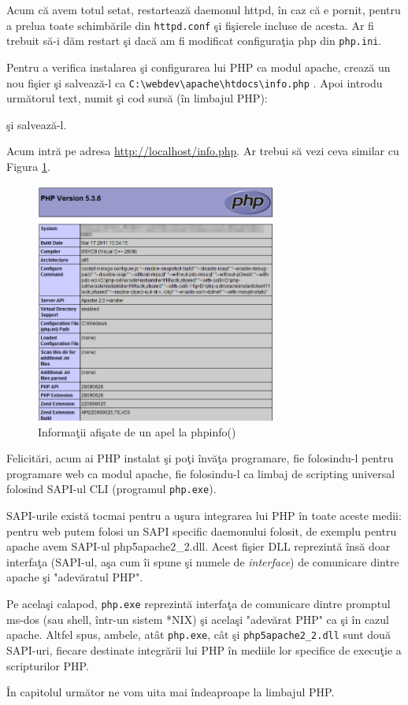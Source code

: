 
Acum că avem totul setat, restartează daemonul httpd, în caz că e pornit, pentru a prelua
toate schimbările din \texttt{httpd.conf} şi fişierele incluse de acesta. Ar fi trebuit să-i
dăm restart şi dacă am fi modificat configuraţia php din \texttt{php.ini}.

Pentru a verifica instalarea şi configurarea lui PHP ca modul apache, crează un nou fişier
şi salvează-l ca 
\texttt{C:{\textbackslash}webdev{\textbackslash}apache{\textbackslash}htdocs{\textbackslash}info.php}
. Apoi introdu următorul text, numit şi cod sursă (în limbajul PHP):

şi salvează-l. 

Acum intră pe adresa \url{http://localhost/info.php}. Ar trebui să vezi ceva similar cu Figura \ref{img:php phpinfo}.

\begin{figure}[ht!]
  \centering
    \includegraphics[width=300px]{cap01/Screenshot-15.png}
  \caption{Informaţii afişate de un apel la phpinfo()}
  \label{img:php phpinfo}
\end{figure}

Felicitări, acum ai PHP instalat şi poţi învăţa programare, fie folosindu-l pentru programare web
ca modul apache, fie folosindu-l ca limbaj de scripting universal folosind SAPI-ul CLI (programul \texttt{php.exe}).

SAPI-urile există tocmai pentru a uşura integrarea lui PHP în toate aceste medii: pentru web putem folosi
un SAPI specific daemonului folosit, de exemplu pentru apache avem SAPI-ul php5apache2\_2.dll.
Acest fişier DLL reprezintă însă doar interfaţa (SAPI-ul, aşa cum îi spune şi numele de \textsl{interface})
de comunicare dintre apache şi "adevăratul PHP".

Pe acelaşi calapod, \texttt{php.exe} reprezintă interfaţa de comunicare dintre promptul ms-dos
(sau shell, într-un sistem *NIX) şi acelaşi "adevărat PHP" ca şi în cazul apache. Altfel spus,
ambele, atât \texttt{php.exe}, cât şi \texttt{php5apache2\_2.dll} sunt două SAPI-uri,
fiecare destinate integrării lui PHP în mediile lor specifice de execuţie a scripturilor PHP.

În capitolul următor ne vom uita mai îndeaproape la limbajul PHP.

